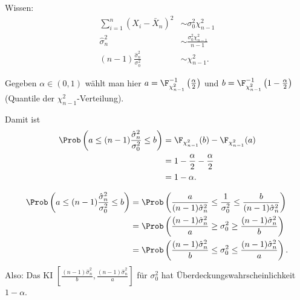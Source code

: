 \documentclass{tstextbook}
\begin{document}
\begin{example}[Normalverteilung]
	Wissen: 
	\[
	\begin{aligned} 
		\sum_{i=1}^{n} (X_i-\bar{X}_n)^2 & \sim \sigma_0^2 \chi_{n-1}^2 \\
		\hat{\sigma}_n^2 & \sim \frac{\sigma_0^2 \chi_{n-1}^2}{n-1} \\
		(n-1) \frac{\hat{\sigma}_n^2}{\sigma_0^2} & \sim \chi_{n-1}^2 .
	\end{aligned}
	\]
	
	Gegeben $ \alpha \in (0,1) $  wählt man hier $ a = \F_{\chi_{n-1}^2}^{-1} \left(\frac{\alpha}{2}\right) $ und $ b = \F_{\chi_{n-1}^2}^{-1} \left(1-\frac{\alpha}{2}\right) $ (Quantile der $ \chi_{n-1}^2 $-Verteilung).
	
	Damit ist 
	\[
	\begin{aligned}
		\Prob\left(a\le (n-1) \frac{\hat{\sigma}_n^2}{\sigma_0^2} \le b \right) & = \F_{\chi_{n-1}^2}(b) - \F_{\chi_{n-1}^2}(a) \\
		& = 1 - \frac{\alpha}{2} - \frac{\alpha}{2} \\
		& = 1 - \alpha.
	\end{aligned}
	\]
	
	\[
	\begin{aligned}
		\Prob\left(a \le (n-1) \frac{\hat{\sigma}_n^2}{\sigma_0^2} \le b \right) & = \Prob\left(\frac{a}{(n-1)\hat{\sigma}_n^2} \le \frac{1}{\sigma_0^2} \le \frac{b}{(n-1)\hat{\sigma}_n^2} \right) \\
		& = \Prob\left(\frac{(n-1)\hat{\sigma}_n^2}{a} \ge \sigma_0^2 \ge \frac{(n-1)\hat{\sigma}_n^2}{b} \right)\\
		& = \Prob\left(\frac{(n-1)\hat{\sigma}_n^2}{b} \le \sigma_0^2 \le \frac{(n-1)\hat{\sigma}_n^2}{a} \right).
	\end{aligned}
	\]
	Also: Das KI $ \left[\frac{(n-1)\hat{\sigma}_n^2}{b}, \frac{(n-1)\hat{\sigma}_n^2}{a} \right] $ für $ \sigma_0^2 $ hat Überdeckungswahrscheinlichkeit $ 1-\alpha $.
\end{example}
\end{document}
